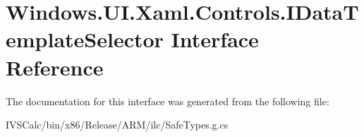 \hypertarget{interface_windows_1_1_u_i_1_1_xaml_1_1_controls_1_1_i_data_template_selector}{}\section{Windows.\+U\+I.\+Xaml.\+Controls.\+I\+Data\+Template\+Selector Interface Reference}
\label{interface_windows_1_1_u_i_1_1_xaml_1_1_controls_1_1_i_data_template_selector}


The documentation for this interface was generated from the following file\+:\begin{DoxyCompactItemize}
\item 
I\+V\+S\+Calc/bin/x86/\+Release/\+A\+R\+M/ilc/Safe\+Types.\+g.\+cs\end{DoxyCompactItemize}
